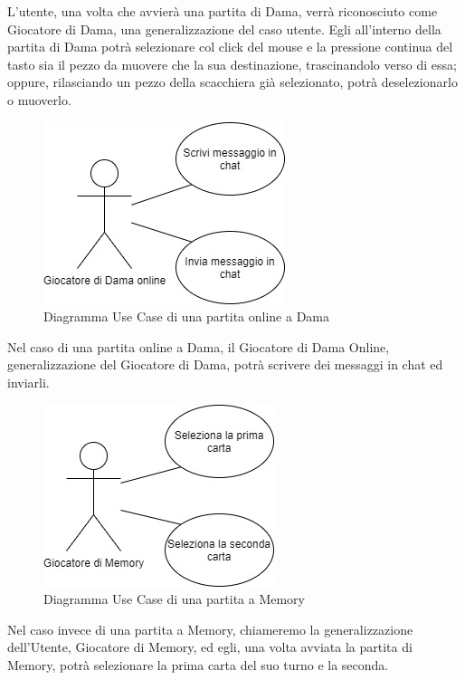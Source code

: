 \documentclass[12pt]{article}
\begin{document}
L'utente, una volta che avvierà una partita di Dama, verrà riconosciuto come Giocatore di Dama, una generalizzazione del caso utente. Egli all'interno della partita di Dama potrà selezionare col click del mouse e la pressione continua del tasto sia il pezzo da muovere che la sua destinazione, trascinandolo verso di essa; oppure, rilasciando un pezzo della scacchiera già selezionato, potrà deselezionarlo o muoverlo.

\begin{figure}[H]
\centering
\includegraphics[scale=.5]{UseCaseCheckersMultiplayer}
\caption{Diagramma Use Case di una partita online a Dama}
\label{img:usecasecheckers}
\end{figure}

Nel caso di una partita online a Dama, il Giocatore di Dama Online, generalizzazione del Giocatore di Dama, potrà scrivere dei messaggi in chat ed inviarli.

\begin{figure}[H]
\centering
\includegraphics[scale=.5]{UseCaseMemory}
\caption{Diagramma Use Case di una partita a Memory}
\label{img:usecasememory}
\end{figure}

Nel caso invece di una partita a Memory, chiameremo la generalizzazione dell'Utente, Giocatore di Memory, ed egli, una volta avviata la partita di Memory, potrà selezionare la prima carta del suo turno e la seconda.
\end{document}
